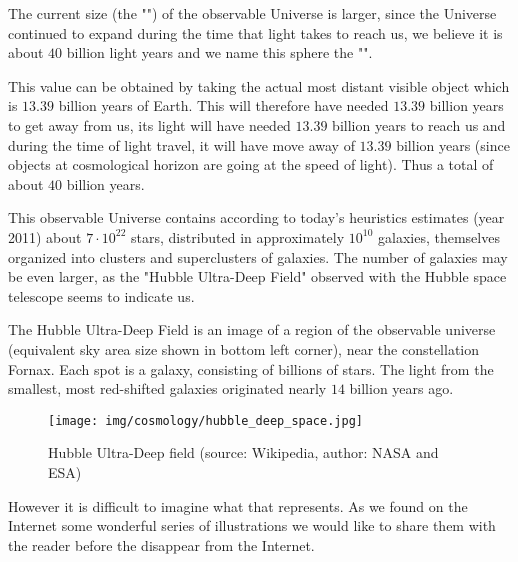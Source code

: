 	The current size (the "") of the observable Universe is larger, since the Universe continued to expand during the time that light takes to reach us, we believe it is about $40$ billion light years and we name this sphere the "".

	This value can be obtained by taking the actual most distant visible object which is $13.39$ billion years of Earth. This will therefore have needed $13.39$ billion years to get away from us, its light will have needed $13.39$ billion years to reach us and during the time of light travel, it will have move away of $13.39$ billion years (since objects at cosmological horizon are going at the speed of light). Thus a total of about $40$ billion years.
	
	This observable Universe contains according to today's heuristics  estimates (year 2011) about $7\cdot 10^{22}$ stars, distributed in approximately $10^{10}$ galaxies, themselves organized into clusters and superclusters of galaxies. The number of galaxies may be even larger, as the "Hubble Ultra-Deep Field" observed with the Hubble space telescope seems to indicate us. 
	
	The Hubble Ultra-Deep Field is an image of a region of the observable universe (equivalent sky area size shown in bottom left corner), near the constellation Fornax. Each spot is a galaxy, consisting of billions of stars. The light from the smallest, most red-shifted galaxies originated nearly $14$ billion years ago.
	\begin{figure}[H]
		\centering
		\texttt{[image: img/cosmology/hubble\_deep\_space.jpg]}
		\caption[Hubble Ultra-Deep field]{Hubble Ultra-Deep field (source: Wikipedia, author: NASA and ESA)}
	\end{figure}
	However it is difficult to imagine what that represents. As we found on the Internet some wonderful series of illustrations we would like to share them with the reader before the disappear from the Internet.

